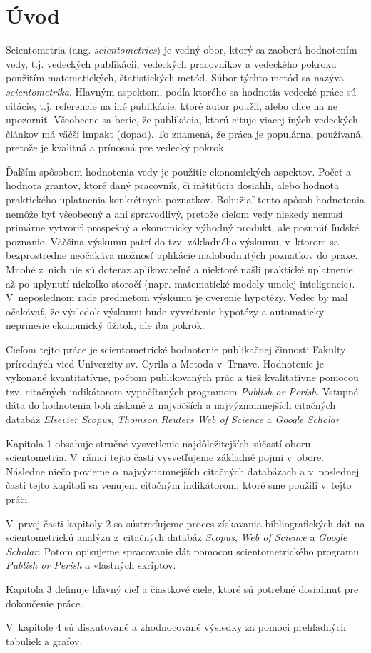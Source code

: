 ﻿\chapter*{Úvod}

Scientometria (ang. \emph{scientometrics}) je vedný obor, ktorý sa zaoberá
hodnotením vedy, t.j. vedeckých publikácii, vedeckých pracovníkov a vedeckého
pokroku použitím matematických, štatistických metód.  Súbor týchto metód sa
nazýva \emph{scientometrika}.  Hlavným aspektom, podľa ktorého sa hodnotia
vedecké práce sú citácie, t.j. referencie na iné publikácie, ktoré autor
použil, alebo chce na ne upozorniť.  Všeobecne sa berie, že publikácia, ktorú
cituje viacej iných vedeckých článkov má väčší impakt (dopad).  To znamená, že
práca je populárna, používaná, pretože je kvalitná a prínosná pre vedecký
pokrok.

Ďalším spôsobom hodnotenia vedy je použitie ekonomických aspektov.  Počet a
hodnota grantov, ktoré daný pracovník, či inštitúcia dosiahli, alebo hodnota
praktického uplatnenia konkrétnych poznatkov.  Bohužiaľ tento spôsob hodnotenia
nemôže byť všeobecný a ani spravodlivý, pretože cieľom vedy niekedy nemusí
primárne vytvoriť prospešný a ekonomicky výhodný produkt, ale posunúť ľudské
poznanie.  Väčšina výskumu patrí do tzv.  základného výskumu, v~ktorom sa
bezprostredne neočakáva možnosť aplikácie nadobudnutých poznatkov do praxe.
Mnohé z~nich nie sú doteraz aplikovateľné a niektoré našli praktické uplatnenie
až po uplynutí niekoľko storočí (napr. matematické modely umelej inteligencie).
V~neposlednom rade predmetom výskumu je overenie hypotézy.  Vedec by mal
očakávať, že výsledok výskumu bude vyvrátenie hypotézy a automaticky neprinesie
ekonomický úžitok, ale iba pokrok.  

Cieľom tejto práce je scientometrické hodnotenie publikačnej činnosti Fakulty
prírodných vied Univerzity sv. Cyrila a Metoda v~Trnave.  Hodnotenie je
vykonané kvantitatívne, počtom publikovaných prác a tiež kvalitatívne pomocou
tzv. citačných indikátorom vypočítaných programom \emph{Publish or Perish}.
Vstupné dáta do hodnotenia boli získané z~najväčších a najvýznamnejších
citačných databáz \emph{Elsevier Scopus}, \emph{Thomson Reuters Web of Science}
a \emph{Google Scholar}

Kapitola 1 obsahuje stručné vysvetlenie najdôležitejších súčastí oboru
 scientometria. V~rámci tejto časti vysvetľujeme základné pojmi v~obore.
Následne niečo povieme o~najvýznamnejších citačných databázach a v~poslednej
časti tejto kapitoli sa venujem citačným indikátorom, ktoré sme použili
v~tejto práci.

V~prvej časti kapitoly 2 sa sústreďujeme  proces získavania bibliografických
dát na scientometrickú analýzu z~citačných databáz \emph{Scopus}, \emph{Web of
Science} a \emph{Google Scholar}.  Potom opisujeme spracovanie dát pomocou
scientometrického programu \emph{Publish or Perish} a vlastných skriptov.

Kapitola 3 definuje hľavný cieľ a čiastkové ciele, ktoré sú potrebné dosiahnuť
pre dokončenie práce.

V~kapitole 4 sú diskutované a zhodnocované  výsledky za pomoci prehľadných
tabuliek a grafov.

